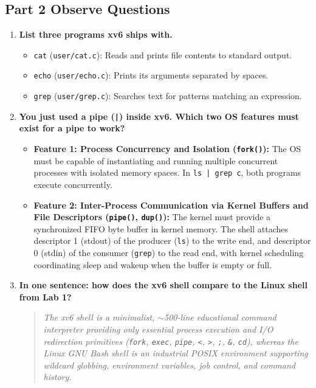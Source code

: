 \documentclass[12pt,a4paper]{article}
\begin{document}
\subsection{Part 2 Observe Questions}
\begin{enumerate}
    \item \textbf{List three programs xv6 ships with.}
    \begin{itemize}
        \item \texttt{cat} (\texttt{user/cat.c}): Reads and prints file contents to standard output.
        \item \texttt{echo} (\texttt{user/echo.c}): Prints its arguments separated by spaces.
        \item \texttt{grep} (\texttt{user/grep.c}): Searches text for patterns matching an expression.
    \end{itemize}

    \item \textbf{You just used a pipe (\texttt{|}) inside xv6. Which two OS features must exist for a pipe to work?}
    \begin{itemize}
        \item \textbf{Feature 1: Process Concurrency and Isolation (\texttt{fork()}):} The OS must be capable of instantiating and running multiple concurrent processes with isolated memory spaces. In \texttt{ls | grep c}, both programs execute concurrently.
        \item \textbf{Feature 2: Inter-Process Communication via Kernel Buffers and File Descriptors (\texttt{pipe()}, \texttt{dup()}):} The kernel must provide a synchronized FIFO byte buffer in kernel memory. The shell attaches descriptor 1 (stdout) of the producer (\texttt{ls}) to the write end, and descriptor 0 (stdin) of the consumer (\texttt{grep}) to the read end, with kernel scheduling coordinating sleep and wakeup when the buffer is empty or full.
    \end{itemize}

    \item \textbf{In one sentence: how does the xv6 shell compare to the Linux shell from Lab 1?}
    \begin{quote}
    \textit{The xv6 shell is a minimalist, $\sim$500-line educational command interpreter providing only essential process execution and I/O redirection primitives (\texttt{fork}, \texttt{exec}, \texttt{pipe}, \texttt{<}, \texttt{>}, \texttt{;}, \texttt{\&}, \texttt{cd}), whereas the Linux GNU Bash shell is an industrial POSIX environment supporting wildcard globbing, environment variables, job control, and command history.}
    \end{quote}
\end{enumerate}
\end{document}
